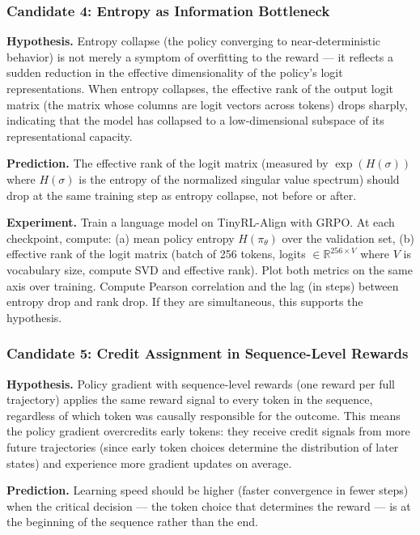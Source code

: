 \subsubsection{Candidate 4: Entropy as Information Bottleneck}

\textbf{Hypothesis.} Entropy collapse (the policy converging to near-deterministic behavior) is not merely a symptom of overfitting to the reward --- it reflects a sudden reduction in the effective dimensionality of the policy's logit representations. When entropy collapses, the effective rank of the output logit matrix (the matrix whose columns are logit vectors across tokens) drops sharply, indicating that the model has collapsed to a low-dimensional subspace of its representational capacity.

\textbf{Prediction.} The effective rank of the logit matrix (measured by $\exp(H(\sigma))$ where $H(\sigma)$ is the entropy of the normalized singular value spectrum) should drop at the same training step as entropy collapse, not before or after.

\textbf{Experiment.} Train a language model on TinyRL-Align with GRPO. At each checkpoint, compute: (a) mean policy entropy $H(\pi_\theta)$ over the validation set, (b) effective rank of the logit matrix (batch of 256 tokens, logits $\in \mathbb{R}^{256 \times V}$ where $V$ is vocabulary size, compute SVD and effective rank). Plot both metrics on the same axis over training. Compute Pearson correlation and the lag (in steps) between entropy drop and rank drop. If they are simultaneous, this supports the hypothesis.

\subsubsection{Candidate 5: Credit Assignment in Sequence-Level Rewards}

\textbf{Hypothesis.} Policy gradient with sequence-level rewards (one reward per full trajectory) applies the same reward signal to every token in the sequence, regardless of which token was causally responsible for the outcome. This means the policy gradient overcredits early tokens: they receive credit signals from more future trajectories (since early token choices determine the distribution of later states) and experience more gradient updates on average.

\textbf{Prediction.} Learning speed should be higher (faster convergence in fewer steps) when the critical decision --- the token choice that determines the reward --- is at the beginning of the sequence rather than the end.

